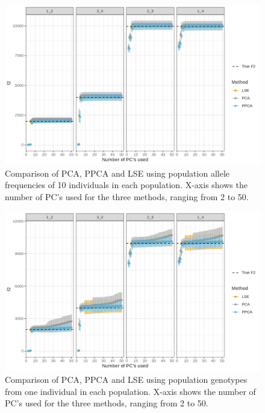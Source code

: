 \documentclass[12pt, letterpaper]{article}
\begin{document}
\begin{figure}[ht!]
    \includegraphics[width=16.5cm]{plots/supplementary/Ne1000_split_times1000_npop10_nind100_mu0_f2_plot_scale_test.png}
    \centering
    \caption{Comparison of PCA, PPCA and LSE using population allele frequencies of 10 individuals in each population. X-axis shows the number of PC's used for the three methods, ranging from 2 to 50.}
    \label{figS1:pc_scale}
\end{figure}


\begin{figure}[ht!]
    \includegraphics[width=16.5cm]{plots/supplementary/Ne1000_split_times1000_npop10_nind100_mu0_f2_plot_scale_test_ind.png}
    \centering
    \caption{Comparison of PCA, PPCA and LSE using population genotypes from one individual in each population. X-axis shows the number of PC's used for the three methods, ranging from 2 to 50.}
    \label{figS2:pc_scale}
\end{figure}
\end{document}

